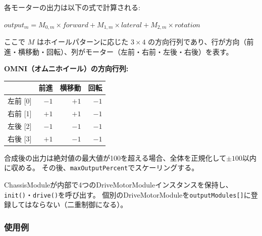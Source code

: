 \begin{notebox}[ベクトル合成と方向行列]
各モーターの出力は以下の式で計算される:

\vspace{0.3em}
$output_m = M_{0,m} \times forward + M_{1,m} \times lateral + M_{2,m} \times rotation$
\vspace{0.3em}

\noindent ここで $M$ はホイールパターンに応じた $3 \times 4$ の方向行列であり、行が方向（前進・横移動・回転）、列がモーター（左前・右前・左後・右後）を表す。

\medskip
\textbf{OMNI（オムニホイール）の方向行列:}
\begin{center}
\begin{tabular}{l r r r}
\toprule
& \textbf{前進} & \textbf{横移動} & \textbf{回転} \\
\midrule
左前 [0] & $-1$ & $+1$ & $-1$ \\
右前 [1] & $+1$ & $+1$ & $-1$ \\
左後 [2] & $-1$ & $-1$ & $-1$ \\
右後 [3] & $+1$ & $-1$ & $-1$ \\
\bottomrule
\end{tabular}
\end{center}

\medskip
合成後の出力は絶対値の最大値が100を超える場合、全体を正規化して$\pm 100$以内に収める。
その後、\texttt{maxOutputPercent}でスケーリングする。
\end{notebox}

\begin{cautionbox}[DriveMotorModuleの管理]
ChassisModuleが内部で4つのDriveMotorModuleインスタンスを保持し、\texttt{init()}・\texttt{drive()}を呼び出す。
個別のDriveMotorModuleを\texttt{outputModules[]}に登録してはならない（二重制御になる）。
\end{cautionbox}

\subsubsection{使用例}


